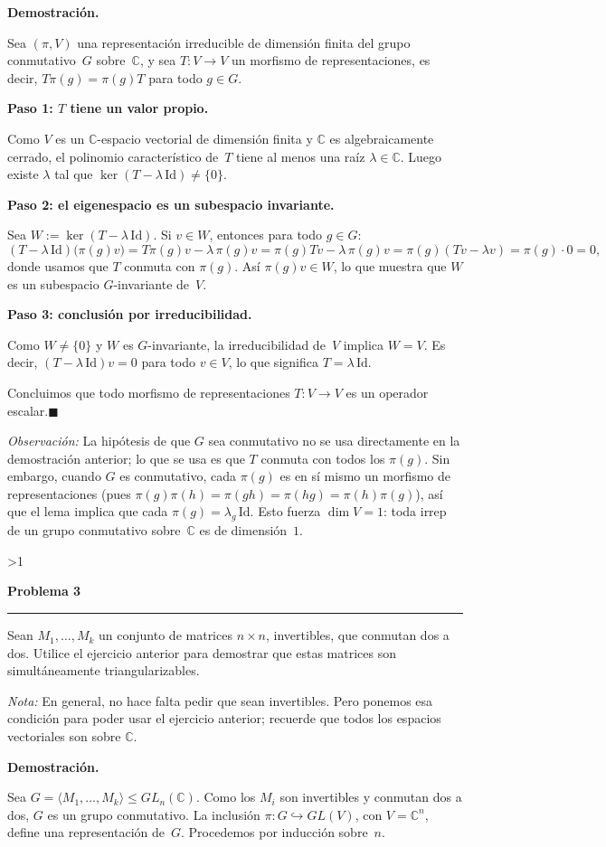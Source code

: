 \documentclass[10pt,a4paper]{article}
\newcommand{\CC}{\mathbb{C}}
\newcommand{\inlinehead}[2][repblue]{%
  \par\smallskip
  {\color{#1}\bfseries #2.}\hspace{0.45em}%
}
\newcounter{probcnt}
\newcommand{\problem}[2]{%
  \stepcounter{probcnt}%
  \ifnum\value{probcnt}>1\newpage\fi
  \par\vspace{0.25em}
  {\large\bfseries\color{repblue} Problema #1}\par
  {\color{repline}\rule{\linewidth}{0.55pt}}\par
  \begin{tcolorbox}[
    breakable,
    colback=white,
    colframe=repline,
    borderline west={1.6pt}{0pt}{repteal},
    left=0.7em,
    right=0.7em,
    top=0.35em,
    bottom=0.3em,
    before skip=0.35em,
    after skip=0.45em
  ]
    #2
  \end{tcolorbox}
}
\begin{document}
\inlinehead{Demostración}
Sea $(\pi,V)$ una representación irreducible de dimensión finita del grupo
conmutativo~$G$ sobre~$\CC$, y sea $T\colon V\to V$ un morfismo de
representaciones, es decir, $T\pi(g)=\pi(g)T$ para todo $g\in G$.

\inlinehead[repteal]{Paso 1: $T$ tiene un valor propio}
Como $V$ es un $\CC$-espacio vectorial de dimensión finita y $\CC$ es
algebraicamente cerrado, el polinomio característico de~$T$ tiene al menos
una raíz $\lambda\in\CC$. Luego existe $\lambda$ tal que
$\ker(T-\lambda\,\mathrm{Id})\neq\{0\}$.

\inlinehead[repteal]{Paso 2: el eigenespacio es un subespacio invariante}
Sea $W:=\ker(T-\lambda\,\mathrm{Id})$. Si $v\in W$, entonces para todo
$g\in G$:
\[
  (T-\lambda\,\mathrm{Id})\bigl(\pi(g)v\bigr)
    = T\pi(g)v - \lambda\,\pi(g)v
    = \pi(g)Tv - \lambda\,\pi(g)v
    = \pi(g)(Tv-\lambda v)
    = \pi(g)\cdot 0 = 0,
\]
donde usamos que $T$ conmuta con $\pi(g)$. Así $\pi(g)v\in W$, lo que
muestra que $W$ es un subespacio $G$-invariante de~$V$.

\inlinehead[repteal]{Paso 3: conclusión por irreducibilidad}
Como $W\neq\{0\}$ y $W$ es $G$-invariante, la irreducibilidad de~$V$ implica
$W=V$. Es decir, $(T-\lambda\,\mathrm{Id})v=0$ para todo $v\in V$, lo que
significa $T=\lambda\,\mathrm{Id}$.

\smallskip
Concluimos que todo morfismo de representaciones $T\colon V\to V$ es un
operador escalar.\hfill$\blacksquare$

\smallskip
\textit{Observación:} La hipótesis de que $G$ sea conmutativo no se usa
directamente en la demostración anterior; lo que se usa es que $T$ conmuta
con todos los $\pi(g)$. Sin embargo, cuando $G$ es conmutativo, cada
$\pi(g)$ es en sí mismo un morfismo de representaciones (pues
$\pi(g)\pi(h)=\pi(gh)=\pi(hg)=\pi(h)\pi(g)$), así que el lema implica que
cada $\pi(g)=\lambda_g\,\mathrm{Id}$. Esto fuerza $\dim V=1$: toda irrep de
un grupo conmutativo sobre~$\CC$ es de dimensión~$1$.

\problem{3}{%
Sean $M_1,\dots,M_k$ un conjunto de matrices $n\times n$, invertibles, que
conmutan dos a dos. Utilice el ejercicio anterior para demostrar que estas
matrices son simultáneamente triangularizables.

\smallskip
\textit{Nota:} En general, no hace falta pedir que sean invertibles. Pero
ponemos esa condición para poder usar el ejercicio anterior; recuerde que
todos los espacios vectoriales son sobre $\CC$.
}

\inlinehead{Demostración}
Sea $G=\langle M_1,\dots,M_k\rangle\leq GL_n(\CC)$. Como los $M_i$ son
invertibles y conmutan dos a dos, $G$ es un grupo conmutativo. La inclusión
$\pi\colon G\hookrightarrow GL(V)$, con $V=\CC^n$, define una
representación de~$G$. Procedemos por inducción sobre~$n$.
\end{document}
